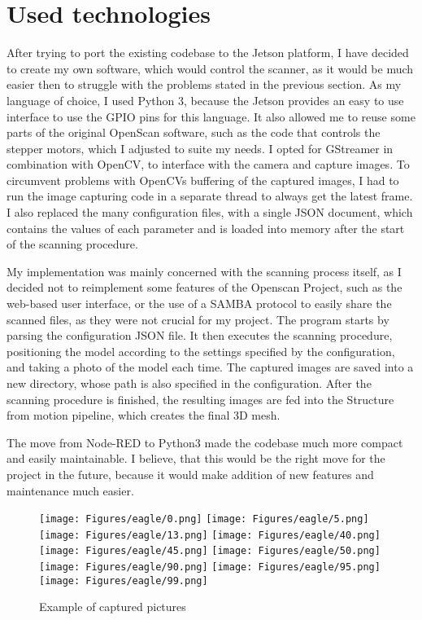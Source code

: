 \section{Used technologies}
After trying to port the existing codebase to the Jetson platform, I have decided to create my own software, which would control the scanner, as it would be much easier then to struggle with the problems stated in the previous section.
As my language of choice, I used Python 3, because the Jetson provides an easy to use interface to use the GPIO pins for this language.
It also allowed me to reuse some parts of the original OpenScan software, such as the code that controls the stepper motors, which I adjusted to suite my needs.
I opted for GStreamer in combination with OpenCV, to interface with the camera and capture images.
To circumvent problems with OpenCVs buffering of the captured images, I had to run the image capturing code in a separate thread to always get the latest frame.
I also replaced the many configuration files, with a single JSON document, which contains the values of each parameter and is loaded into memory after the start of the scanning procedure.

My implementation was mainly concerned with the scanning process itself, as I decided not to reimplement some features of the Openscan Project, such as the web-based user interface, or the use of a SAMBA protocol to easily share the scanned files, as they were not crucial for my project.
The program starts by parsing the configuration JSON file.
It then executes the scanning procedure, positioning the model according to the settings specified by the configuration, and taking a photo of the model each time.
The captured images are saved into a new directory, whose path is also specified in the configuration.
After the scanning procedure is finished, the resulting images are fed into the Structure from motion pipeline, which creates the final 3D mesh.

The move from Node-RED to Python3 made the codebase much more compact and easily maintainable.
I believe, that this would be the right move for the project in the future, because it would make addition of new features and maintenance much easier.

\begin{figure}[h!]
	\begin{center}
	\texttt{[image: Figures/eagle/0.png]}
	\texttt{[image: Figures/eagle/5.png]}
	\texttt{[image: Figures/eagle/13.png]}
	\texttt{[image: Figures/eagle/40.png]}
	\texttt{[image: Figures/eagle/45.png]}
	\texttt{[image: Figures/eagle/50.png]}
	\texttt{[image: Figures/eagle/90.png]}
	\texttt{[image: Figures/eagle/95.png]}
	\texttt{[image: Figures/eagle/99.png]}
	\end{center}
	\caption{ Example of captured pictures}	
\end{figure}


